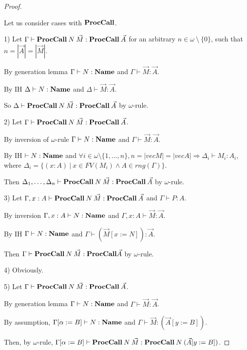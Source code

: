 \documentclass[a4paper]{article}
\begin{document}
\begin{proof}
  $ $

  Let us consider cases with ${\bf ProcCall}$.

1) Let $\Gamma \vdash {\bf ProcCall} \: N \: \vec{M} : {\bf ProcCall} \: \vec{A}$
for an arbitrary $n \in \omega \: \setminus \: \{ 0 \}$, such that $n = |\vec{A}| = |\vec{M}|$.

By generation lemma $\Gamma \vdash N : {\bf Name}$ and $\Gamma \vdash \vec{M} : \vec{A}$.

By IH $\Delta \vdash N : {\bf Name}$ and $\Delta \vdash \vec{M} : \vec{A}$.

So $\Delta \vdash {\bf ProcCall} \: N \: \vec{M} : {\bf ProcCall} \: \vec{A}$ by $\omega$-rule.

\vspace{\baselineskip}

2) Let $\Gamma \vdash {\bf ProcCall} \: N \: \vec{M} : {\bf ProcCall} \: \vec{A}$.

By inversion of $\omega$-rule $\Gamma \vdash N : {\bf Name}$ and $\Gamma \vdash \vec{M} : \vec{A}$.

By IH $\vdash N : {\bf Name}$ and $\forall i \in \omega \setminus \{ 1, \dots, n \}, n = |vec{M}| = |vec{A}| \Rightarrow
\Delta_i \vdash M_i : A_i$, where $\Delta_i = \{ (x : A) \: | \: x \in FV(M_i) \land A \in rng(\Gamma)\}$.

Then $\Delta_1, \dots, \Delta_n \vdash {\bf ProcCall} \: N \: \vec{M} : {\bf ProcCall} \: \vec{A}$ by $\omega$-rule.

\vspace{\baselineskip}

3) Let $\Gamma, x : A \vdash {\bf ProcCall} \: N \: \vec{M} : {\bf ProcCall} \: \vec{A}$ and $\Gamma \vdash P : A$.

By inversion $\Gamma, x : A \vdash N : {\bf Name}$ and $\Gamma, x : A \vdash \vec{M} : \vec{A}$.

By IH $\Gamma \vdash N : {\bf Name}$ and $\Gamma \vdash (\vec{M} [x := N]) : \vec{A}$.

Then $\Gamma \vdash {\bf ProcCall} \: N \: \vec{M} : {\bf ProcCall} \vec{A}$ by $\omega$-rule.

\vspace{\baselineskip}

4) Obviously.

\vspace{\baselineskip}

5) Let $\Gamma \vdash {\bf ProcCall} \: N \: \vec{M} : {\bf ProcCall} \: \vec{A}$.

By generation lemma $\Gamma \vdash N : {\bf Name}$ and $\Gamma \vdash \vec{M} : \vec{A}$.

By assumption, $\Gamma [\alpha := B] \vdash N : {\bf Name}$ and $\Gamma \vdash \vec{M} : (\vec{A} [y := B])$.

Then, by $\omega$-rule, $\Gamma [\alpha := B] \vdash {\bf ProcCall} \: N \: \vec{M} : {\bf ProcCall} \: N \: (\vec{A} [y := B])$.
\end{proof}
\end{document}
